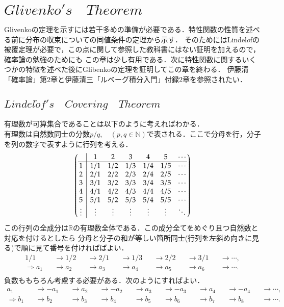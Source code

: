 \documentclass[a4j,papersize,disablejfam,slide,14pt]{jsarticle}
\begin{document}
\section{$Glivenko's\quad Theorem$}
	{\rm Glivenko}の定理を示すには若干多めの準備が必要である．特性関数の性質を述べる前に分布の収束についての同値条件の定理から示す．
    そのためには{\rm Lindel$\ddot{o}$f}の被覆定理が必要で，この点に関して参照した教科書にはない証明を加えるので，確率論の勉強のためにも
    この章は少し有用である．次に特性関数に関するいくつかの特徴を述べた後に{\rm Glibenko}の定理を証明してこの章を終わる．
    伊藤清「確率論」第$2$章と伊藤清三「ルベーグ積分入門」付録$2$章を参照されたい．
\subsection{$Lindel\ddot{o}f's\quad Covering\quad Theorem$}
	有理数が可算集合であることは以下のように考えればわかる．\\
    有理数は自然数同士の分数$p/q,\quad (p,q \in \mathbb{N})$で表される．ここで分母を行，分子を列の数字で表すように行列を考える．
    \begin{align}
    \arraycolsep5pt
    	\left(
    	\begin{array}{@{\,}c|cccccc@{\,}}
    		&1&2&3&4&5&\cdots\\
    		\hline
    		1&1/1&1/2&1/3&1/4&1/5&\cdots\\
    		2&2/1&2/2&2/3&2/4&2/5&\cdots\\
    		3&3/1&3/2&3/3&3/4&3/5&\cdots\\
    		4&4/1&4/2&4/3&4/4&4/5&\cdots\\
    		5&5/1&5/2&5/3&5/4&5/5&\cdots\\
    		\vdots&\vdots&\vdots&\vdots&\vdots&\vdots&\ddots\\
    	\end{array}
    	\right)
    \end{align}
    この行列の全成分は$\mathbb{R}$の有理数全体である．この成分全てをめぐり且つ自然数と対応を付けるとしたら
    分母と分子の和が等しい箇所同士(行列を左斜め向きに見る)で順に見て番号を付ければばよい．
    \begin{align}
    	1/1 &&\to 1/2 &&\to 2/1 &&\to 1/3 &&\to 2/2 &&\to 3/1 &&\to \cdots, \\
        \Rightarrow a_1 &&\to a_2 &&\to a_3 &&\to a_4 &&\to a_5 &&\to a_6 &&\to \cdots. \\
    \end{align}
    負数ももちろん考慮する必要がある．次のようにすればよい．
    \begin{align}
        a_1 &&\to -a_1 &&\to a_2 &&\to -a_2 &&\to a_3 &&\to -a_3 &&\to a_4 &&\to -a_4 &&\to \cdots,\\
        \Rightarrow b_1 &&\to b_2 &&\to b_3 &&\to b_4 &&\to b_5 &&\to b_6 &&\to b_7 &&\to b_8 &&\to \cdots.
    \end{align}
\end{document}

